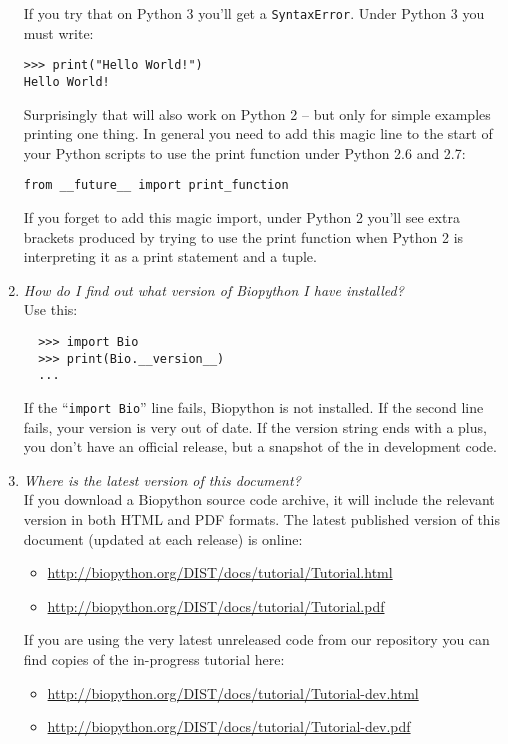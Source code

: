 \documentclass{report}
\begin{document}
\begin{enumerate}
  If you try that on Python 3 you'll get a \verb|SyntaxError|.
  Under Python 3 you must write:

\begin{verbatim}
>>> print("Hello World!")
Hello World!
\end{verbatim}

  Surprisingly that will also work on Python 2 -- but only for simple
  examples printing one thing. In general you need to add this magic
  line to the start of your Python scripts to use the print function
  under Python 2.6 and 2.7:

\begin{verbatim}
from __future__ import print_function
\end{verbatim}

  If you forget to add this magic import, under Python 2 you'll see
  extra brackets produced by trying to use the print function when
  Python 2 is interpreting it as a print statement and a tuple.

  \item \emph{How do I find out what version of Biopython I have installed?} \\
  Use this:
  \begin{verbatim}
  >>> import Bio
  >>> print(Bio.__version__)
  ...
  \end{verbatim}
  If the ``\verb|import Bio|'' line fails, Biopython is not installed.
  If the second line fails, your version is very out of date.
  If the version string ends with a plus, you don't have an official
  release, but a snapshot of the in development code. 

  \item \emph{Where is the latest version of this document?}\\
  If you download a Biopython source code archive, it will include the
  relevant version in both HTML and PDF formats.  The latest published
  version of this document (updated at each release) is online:
  \begin{itemize}
  \item \url{http://biopython.org/DIST/docs/tutorial/Tutorial.html}
  \item \url{http://biopython.org/DIST/docs/tutorial/Tutorial.pdf}
  \end{itemize}
  If you are using the very latest unreleased code from our repository
  you can find copies of the in-progress tutorial here:
  \begin{itemize}
  \item \url{http://biopython.org/DIST/docs/tutorial/Tutorial-dev.html}
  \item \url{http://biopython.org/DIST/docs/tutorial/Tutorial-dev.pdf}
  \end{itemize}
  

\end{enumerate}
\end{document}
